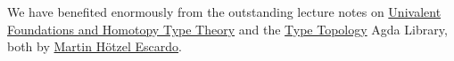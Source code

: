 \documentclass[sigplan,screen]{acmart}
\begin{document}

We have benefited enormously from the outstanding lecture notes on \href{https://www.cs.bham.ac.uk/~mhe/HoTT-UF-in-Agda-Lecture-Notes}{Univalent Foundations and Homotopy Type Theory} and the \href{https://github.com/martinescardo/TypeTopology}{Type Topology} Agda Library, both by \href{https://www.cs.bham.ac.uk/~mhe}{Martin Hötzel Escardo}.





\end{document}
